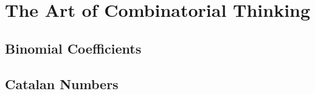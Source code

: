 \chapter{The Art of Combinatorial Thinking}
\section{Binomial Coefficients}
\begin{comment}
\begin{question}
3a
\end{question}
You have $2n$ objects
Divide the objects into two classes
Each class has  $n$ objects
Choose  $k$ objetcs from class  $A$
Choose  $n-k$ objects from class  $B$
Choose a distinguished element from the k choices of objects from class  $A$
==
Choose the distinguished element from $A$ first <=> n
Choose the rest of the elements from  $A\cup B \backslash \{x\}$ where  $x$ is the distinguised elements <=> \binom{2n-1}{n-1}

\begin{question}
3b
\end{question}
Think along subsets

\begin{question}
	\sum_{i=1}^{n}i(n-1) = \\sum_{i=1}^{n}\binom{i}{2} = \sum_{i=0}^{n-2}\binom{n-i}{2} = \binom{n+1}{3} 
\end{question}
Three numbers out of the $n+1$ choices say $a_{1}<a_{2}<a_{3}$. Now argue for the first three sums based on which one of these is chosen first. 

The first sum corresponds to choosing $a_2$. The second sum corresponds to choosing  $a_{3}$. The third sum corresponds to choosing $a_{1}$.

\begin{question}
	For all $n\geq r\geq 0$ we have 
	 \[
		 \binom{r}{r}+\binom{r+1}{r}+\cdots+\binom{n}{r} = \binom{n+1}{r+1}
	.\] 
\end{question}
Give a proof using lattice paths. 
RHS is the number of lattice paths from $(0,0)\to (r+1,n-r)$. For the LHS what happens before the last E step.

The idea is not always to prove equalities. Infact more often than not we will be interested in proving inequalities
 \begin{question}
	 \binom{2n}{n}<4^n
\end{question}
Convert binary to lattice: 0 to N, 1 to E and so on.

Next we prove the Chu-Vandermonde identity.
\begin{question}
	\binom{2n}{n} = \sum_{k=0}^{n} \binom{n}{k}^2
\end{question}

\begin{question}
	For all $n>0$. \[
		\sum_{k=0}^{n} 2^k\binom{n}{k} = 3^n
	\]
\end{question}

\begin{question}
	For $n>0$  \[
		2\binom{2n-1}{n} = \binom{2n}{n}
	.\] 
\end{question}
Give two proofs. One using Pascals identity. The other by choosing sets.
\end{comment}
\section{Catalan Numbers}
\endinput
